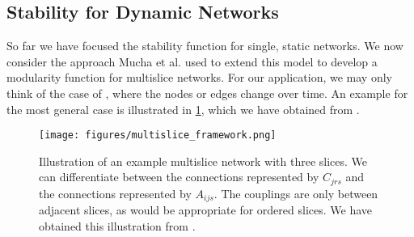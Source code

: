 \subsection{Stability for Dynamic Networks}
\label{subsec:stabilityForDynamicNetworks}

So far we have focused the stability function for single, static networks.
We now consider the approach Mucha et al. \cite{MRM+10} used to extend this model to develop a modularity function for multislice networks.
For our application, we may only think of the case of , where the nodes or edges change over time.
An example for the most general case is illustrated in \cref{fig:exampleMultisliceNetwork}, which we have obtained from \cite{OxNet}.

\begin{figure}
	\centering
	\texttt{[image: figures/multislice\_framework.png]}
	\caption[Illustration of an example multislice network with three slices.]{\label{fig:exampleMultisliceNetwork} Illustration of an example multislice network with three slices. We can differentiate between the  connections represented by $C_{jrs}$ and the  connections represented by $A_{ijs}$. The couplings are only between adjacent slices, as would be appropriate for ordered slices. We have obtained this illustration from \cite{OxNet}.}
\end{figure}


